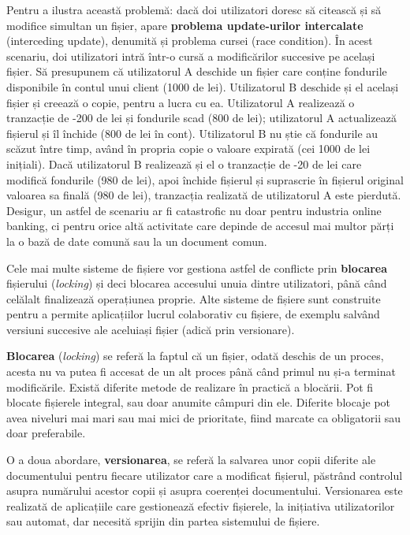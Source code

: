Pentru a ilustra această problemă:  dacă doi utilizatori doresc să citească și
să modifice simultan un fișier, apare \textbf{problema update-urilor
intercalate} (interceding update), denumită și problema cursei (race condition).
În acest scenariu, doi utilizatori intră într-o cursă a modificărilor succesive
pe același fișier. Să presupunem că utilizatorul A deschide un fișier care
conține fondurile disponibile în contul unui client (1000 de lei). Utilizatorul
B deschide și el același fișier și creează o copie, pentru a lucra cu ea.
Utilizatorul A realizează o tranzacție de -200 de lei și fondurile scad (800 de
lei); utilizatorul A actualizează fișierul și îl închide (800 de lei în cont).
Utilizatorul B nu știe că fondurile au scăzut între timp, având în propria copie
o valoare expirată (cei 1000 de lei inițiali). Dacă utilizatorul B realizează și
el o tranzacție de -20 de lei care modifică fondurile (980 de lei), apoi închide
fișierul și suprascrie în fișierul original valoarea sa finală (980 de lei),
tranzacția realizată de utilizatorul A este pierdută.  Desigur, un astfel de
scenariu ar fi catastrofic nu doar pentru industria online banking, ci pentru
orice altă activitate care depinde de accesul mai multor părți la o bază de date
comună sau la un document comun.

Cele mai multe sisteme de fișiere vor gestiona astfel de conflicte prin
\textbf{blocarea} fișierului (\textit{locking}) și deci blocarea accesului unuia
dintre utilizatori, până când celălalt finalizează operațiunea proprie. Alte
sisteme de fișiere sunt construite pentru a permite aplicațiilor lucrul
colaborativ cu fișiere, de exemplu salvând versiuni succesive ale aceluiași
fișier (adică prin versionare).

\textbf{Blocarea} (\textit{locking}) se referă la faptul că un fișier, odată
deschis de un proces, acesta nu va putea fi accesat de un alt proces până când
primul nu și-a terminat modificările.  Există diferite metode de realizare în
practică a blocării. Pot fi blocate fișierele integral, sau doar anumite câmpuri
din ele. Diferite blocaje pot avea niveluri mai mari sau mai mici de prioritate,
fiind marcate ca obligatorii sau doar preferabile.

O a doua abordare, \textbf{versionarea}, se referă la salvarea unor copii
diferite ale documentului pentru fiecare utilizator care a modificat fișierul,
păstrând controlul asupra numărului acestor copii și asupra coerenței
documentului. Versionarea este realizată de aplicațiile care gestionează efectiv
fișierele, la inițiativa utilizatorilor sau automat, dar necesită sprijin din
partea sistemului de fișiere.

